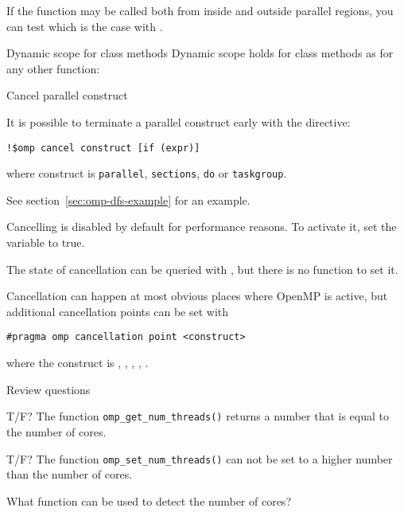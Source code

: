 If the function may be called both from inside and outside parallel
regions, you can test which is the case with .

\begin{cppnote}{Dynamic scope for class methods}
  Dynamic scope holds for class methods as for any other function:
  \def\snippetcodefraction{.4}
  \def\snippetlistfraction{.55}
\end{cppnote}


 {Cancel parallel construct}
\label{sec:omp-cancel}

It is possible to terminate a parallel construct early
with the  directive:
\begin{lstlisting}
!$omp cancel construct [if (expr)]
\end{lstlisting}
where construct is
\lstinline{parallel},
\lstinline{sections},
\lstinline{do}
or
\lstinline{taskgroup}.

See section~\ref{sec:omp-dfs-example} for an example.

Cancelling is disabled by default for performance reasons.
To activate it, set the  variable to true.

The state of cancellation can be queried with ,
but there is no function to set it.

Cancellation can happen at most obvious places where OpenMP is active,
but additional cancellation points can be set with 
\begin{lstlisting}
#pragma omp cancellation point <construct>
\end{lstlisting}
where the construct is , ,
, , .

 {Review questions}

\begin{exercise}
  T/F?
  The function \lstinline+omp_get_num_threads()+
  returns a number that is equal to the number of cores.
\end{exercise}

\begin{exercise}
  T/F?
  The function \lstinline+omp_set_num_threads()+
  can not be set to a higher number than the number of cores.
\end{exercise}

\begin{exercise}
  What function can be used to detect the number of cores? 
\end{exercise}
